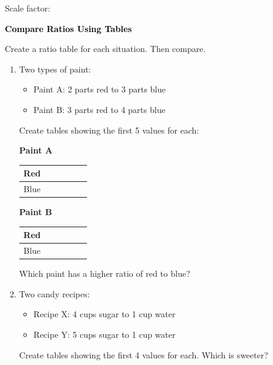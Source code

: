 \documentclass[12pt, letterpaper, fleqn]{article}
\newcommand{\blanklong}{\underline{\hspace{6.5cm}}}
\newcommand{\blankshorter}{\underline{\hspace{1.5cm}}}
\begin{document}
\vspace{2mm}

\noindent
Scale factor: \blankshorter

\newpage

\begin{tcolorbox}[colback=customteal!20]
\large\textcolor{black}{\textbf{Compare Ratios Using Tables}}
\end{tcolorbox}

\noindent
Create a ratio table for each situation. Then compare.

\vspace{3mm}

\begin{enumerate}[itemsep=2.5cm, leftmargin=0.6cm]

\item Two types of paint:
\begin{itemize}
    \item Paint A: 2 parts red to 3 parts blue
    \item Paint B: 3 parts red to 4 parts blue
\end{itemize}

Create tables showing the first 5 values for each:

\begin{center}
\textbf{Paint A}
\begin{tabular}{|c|c|c|c|c|c|}
\hline
Red & & & & & \\
\hline
Blue & & & & & \\
\hline
\end{tabular}
\quad
\textbf{Paint B}
\begin{tabular}{|c|c|c|c|c|c|}
\hline
Red & & & & & \\
\hline
Blue & & & & & \\
\hline
\end{tabular}
\end{center}

\vspace{1cm}

Which paint has a higher ratio of red to blue? \blanklong

\item Two candy recipes:
\begin{itemize}
    \item Recipe X: 4 cups sugar to 1 cup water
    \item Recipe Y: 5 cups sugar to 1 cup water
\end{itemize}

Create tables showing the first 4 values for each. Which is sweeter?

\vspace{2.5cm}

\end{enumerate}
\end{document}
